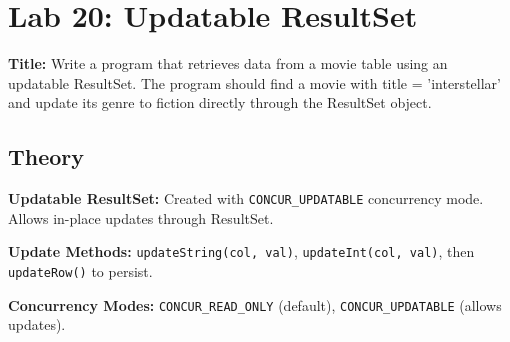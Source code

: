 \documentclass[10pt,a4paper]{article}
\begin{document}
\newpage
\section*{Lab 20: Updatable ResultSet}

\textbf{Title:} Write a program that retrieves data from a movie table using an updatable ResultSet. The program should find a movie with title = 'interstellar' and update its genre to fiction directly through the ResultSet object.

\subsection*{Theory}
\textbf{Updatable ResultSet:} Created with \texttt{CONCUR\_UPDATABLE} concurrency mode. Allows in-place updates through ResultSet.

\textbf{Update Methods:} \texttt{updateString(col, val)}, \texttt{updateInt(col, val)}, then \texttt{updateRow()} to persist.

\textbf{Concurrency Modes:} \texttt{CONCUR\_READ\_ONLY} (default), \texttt{CONCUR\_UPDATABLE} (allows updates).
\end{document}
